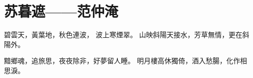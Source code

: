 \section{苏暮遮——范仲淹}

碧雲天，黃葉地，秋色連波， 波上寒煙翠。
山映斜陽天接水，芳草無情，更在斜陽外。


黯鄉魂，追旅思，夜夜除非，好夢留人睡。
明月樓高休獨倚，酒入愁腸，化作相思淚。
